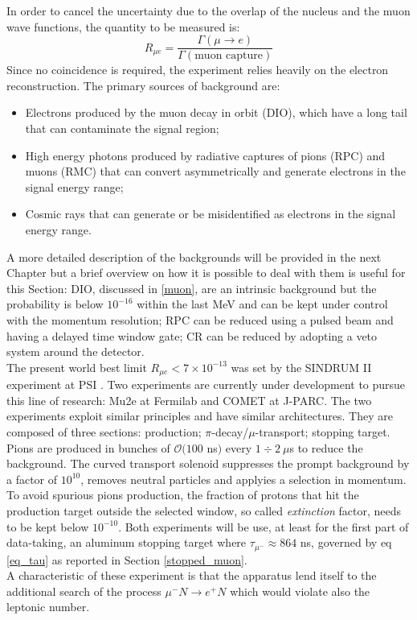 \documentclass[12pt,a4paper,openright, oneside, titlepage]{book} %
\begin{document}
\noindent
In order to cancel the uncertainty due to the overlap of the nucleus and the muon wave functions, 
the quantity to be measured is: 
$$R_{\mu e} = \frac{\Gamma(\mu\rightarrow e)}{\Gamma(\textrm{muon capture})}$$
Since no coincidence is required, the experiment relies heavily on the electron reconstruction. 
The primary sources of background are:
\begin{itemize}
\item Electrons produced by the muon decay in orbit (DIO), which have a long tail that can contaminate the signal region;
\item High energy photons produced by radiative captures of pions (RPC) and muons (RMC) that can convert asymmetrically
and generate electrons in the signal energy range;
\item Cosmic rays that can generate or be misidentified as electrons in the signal energy range.
\end{itemize}
A more detailed description of the backgrounds will be provided in the next Chapter 
but a brief overview on how it is possible to deal with them is useful for this Section: 
DIO, discussed in \ref{muon}, are an intrinsic background 
but the probability is below $10^{-16}$ within the last MeV 
and can be kept under control with the momentum resolution; 
RPC can be reduced using a pulsed beam and having a delayed time window gate; 
CR can be reduced by adopting a veto system around the detector.\\
The present world best limit  $R_{\mu e}<7\times10^{-13}$ 
was set by the SINDRUM II experiment at PSI \cite{SINDRUMII}.
Two experiments are currently under development to pursue this line of research: 
Mu2e \cite{MTDR} at Fermilab and COMET \cite{COMET_I} at J-PARC. 
The two experiments exploit similar principles and have similar architectures.
They are composed of three sections: production; $\pi$-decay/$\mu$-transport; stopping target. 
Pions are produced in bunches of $\mathcal{O}(100$ ns$)$ every $1\div 2\ \mu$s to reduce the background. 
The curved transport solenoid suppresses the prompt background by a factor of $10^{10}$,
removes neutral particles and applyies a selection in momentum. 
To avoid spurious pions production, the fraction of protons that hit the production target outside the selected window, so called \textit{extinction} factor, needs to be kept below $10^{-10}$. Both experiments will be use, at least for the first part of
data-taking, an aluminum stopping target where $\tau_{\mu^-}\approx 864$ ns, governed by eq \ref{eq_tau} 
as reported in Section \ref{stopped_muon}. \\
A characteristic of these experiment is that the apparatus lend itself to the additional search of the process $\mu^- N \rightarrow e^+ N$ which would violate also the leptonic number.
\end{document}
